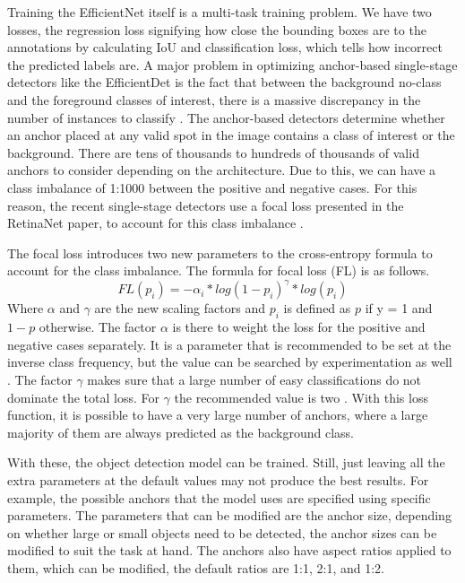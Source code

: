 Training the EfficientNet itself is a multi-task training problem. 
We have two losses, the regression loss signifying how close the bounding boxes are to the annotations by calculating IoU and classification loss, which tells how incorrect the predicted labels are.
A major problem in optimizing anchor-based single-stage detectors like the EfficientDet is the fact that between the background no-class and the foreground classes of interest, there is a massive discrepancy in the number of instances to classify \citep{retinaNet}.
The anchor-based detectors determine whether an anchor placed at any valid spot in the image contains a class of interest or the background. 
There are tens of thousands to hundreds of thousands of valid anchors to consider depending on the architecture. 
Due to this, we can have a class imbalance of 1:1000 between the positive and negative cases.
For this reason, the recent single-stage detectors use a focal loss presented in the RetinaNet paper, to account for this class imbalance \citep{retinaNet}.

The focal loss introduces two new parameters to the cross-entropy formula to account for the class imbalance. 
The formula for focal loss (FL) is as follows.
\[FL(p_i) = -\alpha_i * log(1-p_i)^\gamma * log(p_i)\] \noindent
Where $\alpha$ and $\gamma$ are the new scaling factors and $p_i$ is defined as $p$ if y = 1 and $1 - p$ otherwise.
The factor $\alpha$ is there to weight the loss for the positive and negative cases separately. 
It is a parameter that is recommended to be set at the inverse class frequency, but the value can be searched by experimentation as well \citep{retinaNet}.
The factor $\gamma$ makes sure that a large number of easy classifications do not dominate the total loss.
For $\gamma$ the recommended value is two \citep{retinaNet}.
With this loss function, it is possible to have a very large number of anchors, where a large majority of them are always predicted as the background class.

With these, the object detection model can be trained.
Still, just leaving all the extra parameters at the default values may not produce the best results.
For example, the possible anchors that the model uses are specified using specific parameters.
The parameters that can be modified are the anchor size, depending on whether large or small objects need to be detected, the anchor sizes can be modified to suit the task at hand.
The anchors also have aspect ratios applied to them, which can be modified, the default ratios are 1:1, 2:1, and 1:2. 

